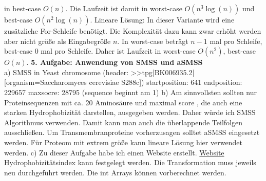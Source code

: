 \documentclass{article}
\begin{document}
\begin{flushleft}
in best-case $O(n)$. Die Laufzeit ist damit in worst-case $O(n^3\log(n))$ und best-case $O(n^2\log(n))$. 
\newline
Lineare Lösung: In dieser Variante wird eine zusätzliche For-Schleife benötigt. Die Komplexität dazu kann zwar erhöht 
werden aber nicht größe als Eingabegröße $n$.
In worst-case beträgt $n-1$ mal pro Schleife, best-case 0 mal pro Schleife.
Daher ist Laufzeit in worst-case $O(n^2)$, best-case $O(n)$.
\newline\newline\newline
\textbf{5. Aufgabe: Anwendung von SMSS und aSMSS}\\
a) SMSS in Yeast chromosome (header: >>tpg|BK006935.2| [organism=Saccharomyces cerevisiae S288c])
\newline
startposition: 641	endposition: 229657	maxsocre: 28795 (sequence beginnt am 1)
\newline
b) Am sinnvollsten sollten nur Proteinsequenzen mit ca. 20 Aminosäure und maximal score 
, die auch eine starken Hydrophobizität darstellen, ausgegeben werden.
Daher würde ich SMSS Algorithmus verwenden. Damit kann man auch die überlappende Teilfolgen ausschließen.
\newline
Um Transmembranproteine vorherzusagen solltet aSMSS eingesetzt werden. Für Proteom mit extrem größe kann 
lineare Lösung hier verwendet werden. 
c)
Zu dieser Aufgabe habe ich einen Website erstellt.
\newline
\href{http://bioclient1.bio.ifi.lmu.de/~hexih/SMSS_predict.py}{Website} 
\newline
Hydrophobizitätsindex kann festgelegt werden.
\newline
Die Transformation muss jeweils neu durchgeführt werden.
Die int Arrays können vorberechnet werden.
\end{flushleft}
\end{document}
